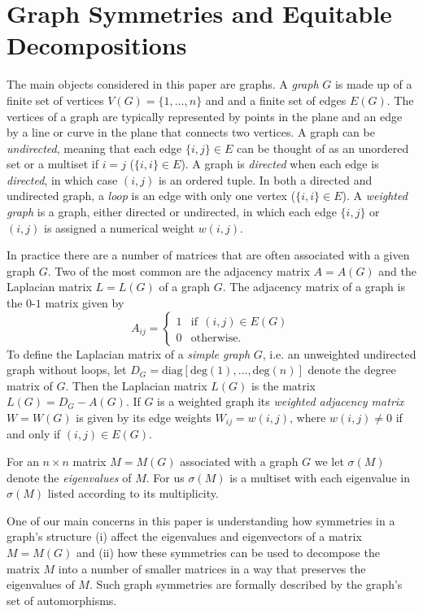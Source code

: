 \documentclass[preprint,12pt]{elsarticle}
\theoremstyle{definition}
\theoremstyle{remark}
\renewcommand{\emph}{\textit}
\begin{document}
\section{Graph Symmetries and Equitable Decompositions}\label{sec:EP}

The main objects considered in this paper are graphs. A \emph{graph} $G$ is made up of a finite set of vertices $V(G)=\{1,\dots,n\}$ and and a finite set of edges $E(G)$. The vertices of a graph are typically represented by points in the plane and an edge by a line or curve in the plane that connects two vertices. A graph can be \emph{undirected}, meaning that each edge $\{i,j\}\in E$ can be thought of as an unordered set or a multiset if $i=j$ ($\{i,i\}\in E$). A graph is \emph{directed} when each edge is {\emph{directed}, in which case $(i,j)$ is an ordered tuple. In both a directed and undirected graph, a} \emph{loop} is an edge with only one vertex ($\{i, i\}\in E$). A \emph{weighted graph} is a graph, either directed or undirected, in which each edge $\{i,j\}$ or $(i,j)$ is assigned a numerical weight $w(i,j)$.

In practice there are a number of matrices that are often associated with a given graph $G$. Two of the most common are the adjacency matrix $A=A(G)$ and the Laplacian matrix $L=L(G)$ of a graph $G$. The adjacency matrix of a graph is the $0$-$1$ matrix given by
\[
A_{ij}=
\begin{cases}
1 &\text{if} \ \ (i,j)\in E(G)\\
0 &\text{otherwise}.
\end{cases}
\]
To define the Laplacian matrix of a \emph{simple graph} $G$, i.e. an unweighted undirected graph without loops, let $D_G=\text{diag}[\text{deg}(1),\dots,\text{deg}(n)]$ denote the degree matrix of $G$. Then the Laplacian matrix $L(G)$ is the matrix $L(G)=D_G-A(G)$. If $G$ is a weighted graph its \textit{weighted adjacency matrix} $W=W(G)$ is given by its edge weights $W_{ij} = w(i,j)$,  where  $w(i,j) \neq 0$ if and only if $(i,j) \in E(G)$.

For an $n\times n$ matrix $M=M(G)$ associated with a graph $G$ we let $\sigma(M)$ denote the \emph{eigenvalues} of $M$. For us $\sigma(M)$ is a multiset with each eigenvalue in $\sigma(M)$ listed according to its multiplicity.

One of our main concerns in this paper is understanding how symmetries in a graph's structure (i) affect the eigenvalues and eigenvectors of a matrix $M=M(G)$ and (ii) how these symmetries can be used to decompose the matrix $M$ into a number of smaller matrices in a way that preserves the eigenvalues of $M$. Such graph symmetries are formally described by the graph's set of automorphisms.
\end{document}
